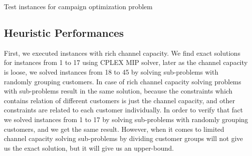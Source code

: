 \documentclass[11pt]{article}
\begin{document}
\begin{table}[!htb]
\caption[Short Caption for LoT]{Test instances for campaign optimization problem}\label{table:tbl_test_instances}
\end{table}


\subsection{Heuristic Performances} \label{s:test_evaluation}
First, we executed instances with rich channel capacity. We find exact solutions for instances from 1 to 17 using CPLEX MIP solver, later as the channel capacity is loose, we solved instances from 18 to 45 by solving sub-problems with randomly grouping customers. In case of rich channel capacity solving problems with sub-problems result in the same solution, because the constraints which contains relation of different customers is just the channel capacity, and other constraints are related to each customer individually. In order to verify that fact we solved instances from 1 to 17 by solving sub-problems with randomly grouping customers, and we get the same result. However, when it comes to limited channel capacity solving sub-problems by dividing customer groups will not give us the exact solution, but it will give us an upper-bound.\\
\end{document}
